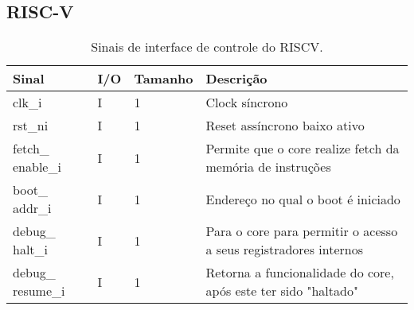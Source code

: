 \subsection{RISC-V}
\label{sec:riscv}
\begin{table}[H]
  \centering
  \renewcommand\arraystretch{1.25}
  \caption{Sinais de interface de controle do RISCV.}
  \vspace{2mm}
  \begin{tabular}{|P{4.0cm}|P{0.7cm}|P{1.5cm}|P{8cm}|}
    \hline
    \textbf{Sinal}        & \textbf{I/O} & \textbf{Tamanho} & \textbf{Descrição}                                    \\ \hline
    clk\_i                 & I            & 1                & Clock síncrono                                       \\ \hline
    rst\_ni                & I            & 1                & Reset assíncrono baixo ativo                          \\ \hline
     fetch\_ enable\_i               & I            & 1    & Permite que o core realize fetch da memória de instruções \\ \hline
     boot\_ addr\_i               & I            & 1    & Endereço no qual o boot é iniciado \\ \hline
      debug\_ halt\_i              & I            & 1                & Para o core para permitir o acesso a seus registradores internos                          \\ \hline
       debug\_ resume\_i                & I            & 1                & Retorna a funcionalidade do core, após este ter sido "haltado" \\ \hline
\end{tabular} 
\end{table}
